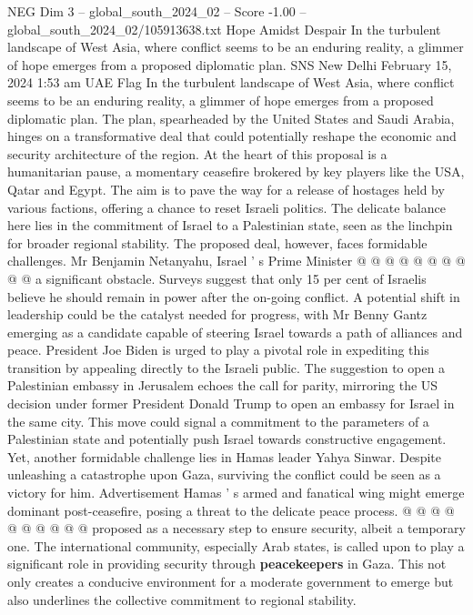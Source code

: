 \begin{textsample}{NEG Dim 3 – global\_south\_2024\_02 – Score -1.00 – global\_south\_2024\_02/105913638.txt}  \label{ex:f3_neg_091}
Hope Amidst Despair In the turbulent landscape of West Asia, where conflict seems to be an enduring reality, a glimmer of hope emerges from a proposed diplomatic plan.
SNS New Delhi February 15, 2024 1:53 am UAE Flag In the turbulent landscape of West Asia, where conflict seems to be an enduring reality, a glimmer of hope emerges from a proposed diplomatic plan.
The plan, spearheaded by the United States and Saudi Arabia, hinges on a transformative deal that could potentially reshape the economic and security architecture of the region.
At the heart of this proposal is a humanitarian pause, a momentary ceasefire brokered by key players like the USA, Qatar and Egypt.
The aim is to pave the way for a release of hostages held by various factions, offering a chance to reset Israeli politics.
The delicate balance here lies in the commitment of Israel to a Palestinian state, seen as the linchpin for broader regional stability.
The proposed deal, however, faces formidable challenges.
Mr Benjamin Netanyahu, Israel ' s Prime Minister @ @ @ @ @ @ @ @ @ @ a significant obstacle.
Surveys suggest that only 15 per cent of Israelis believe he should remain in power after the on-going conflict.
A potential shift in leadership could be the catalyst needed for progress, with Mr Benny Gantz emerging as a candidate capable of steering Israel towards a path of alliances and peace.
President Joe Biden is urged to play a pivotal role in expediting this transition by appealing directly to the Israeli public.
The suggestion to open a Palestinian embassy in Jerusalem echoes the call for parity, mirroring the US decision under former President Donald Trump to open an embassy for Israel in the same city.
This move could signal a commitment to the parameters of a Palestinian state and potentially push Israel towards constructive engagement.
Yet, another formidable challenge lies in Hamas leader Yahya Sinwar.
Despite unleashing a catastrophe upon Gaza, surviving the conflict could be seen as a victory for him.
Advertisement Hamas ' s armed and fanatical wing might emerge dominant post-ceasefire, posing a threat to the delicate peace process. @ @ @ @ @ @ @ @ @ @ proposed as a necessary step to ensure security, albeit a temporary one.
The international community, especially Arab states, is called upon to play a significant role in providing security through \textbf{peacekeepers} in Gaza.
This not only creates a conducive environment for a moderate government to emerge but also underlines the collective commitment to regional stability.

\end{textsample}
